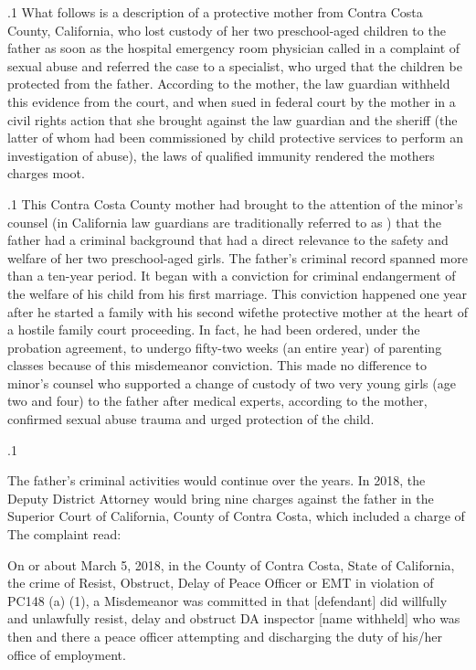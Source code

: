 \documentclass[11pt, twoside]{article}
\begin{document}
{\p.1{%
What follows is a description of a protective mother from Contra
Costa County, California, who lost custody of her two preschool-aged
children to the father as soon as the hospital emergency room physician
called in a complaint of sexual abuse and referred the case to a specialist,
who urged that the children be protected from the father. According to
the mother, the law guardian withheld this evidence from the court, and
when sued in federal court by the mother in a civil rights action that she
brought against the law guardian and the sheriff (the latter of whom had
been commissioned by child protective services to perform an investigation of abuse), the laws of qualified immunity rendered the mothers
charges moot.
}%

\p.1{%
This Contra Costa County mother had brought to the attention of the
minor’s counsel (in California law guardians are traditionally referred
to as ) that the father had a criminal background that
had a direct relevance to the safety and welfare of her two preschool-aged
girls. The father’s criminal record spanned more than a ten-year period.
It began with a conviction for criminal endangerment of the welfare of
his child from his first marriage. This conviction happened one year after he started a family with his second wife\mdash{}the protective mother at the
heart of a hostile family court proceeding. In fact, he had been ordered,
under the probation agreement, to undergo fifty-two weeks (an entire
year) of parenting classes because of this misdemeanor conviction.
This made no difference to minor’s counsel who supported a change
of custody of two very young girls (age two and four) to the father after medical experts, according to the mother, confirmed sexual abuse
trauma and urged protection of the child.
}%

\p.1{%
The father’s criminal activities would continue over the years. In 2018,
the Deputy District Attorney would bring nine charges against the father in the Superior Court of California, County of Contra Costa, which
included a charge of  The
complaint read:

\begin{blockQuote}
On or about March 5, 2018, in the County of Contra Costa, State of
California, the crime of Resist, Obstruct, Delay of Peace Officer or
EMT in violation of PC148 (a) (1), a Misdemeanor was committed
in that [defendant] did willfully and unlawfully resist, delay and
obstruct DA inspector [name withheld] who was then and there a
peace officer attempting and discharging the duty of his/her office
of employment.
\end{blockQuote}

}}
\end{document}
